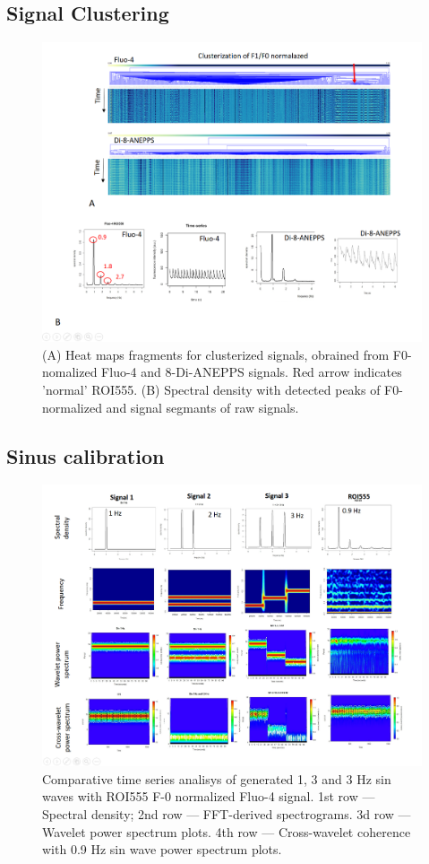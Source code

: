 \documentclass{biophys-new}
\begin{document}
\subsection*{Signal Clustering}

\begin{figure}
    \includegraphics[width=0.9\linewidth]{fig6.png}
    \caption{(A) Heat maps fragments for clusterized signals, obrained from  F0-nomalized Fluo-4 and 8-Di-ANEPPS signals. Red arrow indicates 'normal' ROI555. (B) Spectral density with detected peaks of F0-normalized and signal segmants of raw signals.}
    \label{fig:fig6}
\end{figure}

\subsection*{Sinus calibration}

\begin{figure}
    \includegraphics[width=0.9\linewidth]{fig7.png}
    \caption{Comparative time series analisys of generated 1, 3 and 3 Hz sin waves with ROI555 F-0 normalized Fluo-4 signal. 1st row --- Spectral density; 2nd row --- FFT-derived spectrograms. 3d row --- Wavelet power spectrum plots. 4th row --- Cross-wavelet coherence with 0.9 Hz sin wave power spectrum plots. }
    \label{fig:fig7}
\end{figure}
\end{document}
